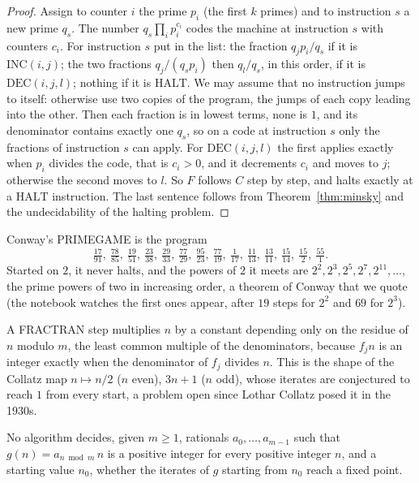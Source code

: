 \begin{proof}
Assign to counter $i$ the prime $p_i$ (the first $k$ primes) and to instruction $s$ a new prime $q_s$. The number $q_s\prod_ip_i^{c_i}$ codes the machine at instruction $s$ with counters $c_i$. For instruction $s$ put in the list: the fraction $q_jp_i/q_s$ if it is $\mathrm{INC}(i,j)$; the two fractions $q_j/(q_sp_i)$ then $q_l/q_s$, in this order, if it is $\mathrm{DEC}(i,j,l)$; nothing if it is $\mathrm{HALT}$. We may assume that no instruction jumps to itself: otherwise use two copies of the program, the jumps of each copy leading into the other. Then each fraction is in lowest terms, none is $1$, and its denominator contains exactly one $q_s$, so on a code at instruction $s$ only the fractions of instruction $s$ can apply. For $\mathrm{DEC}(i,j,l)$ the first applies exactly when $p_i$ divides the code, that is $c_i>0$, and it decrements $c_i$ and moves to $j$; otherwise the second moves to $l$. So $F$ follows $C$ step by step, and halts exactly at a $\mathrm{HALT}$ instruction. The last sentence follows from Theorem~\ref{thm:minsky} and the undecidability of the halting problem.
\end{proof}

Conway's PRIMEGAME is the program
\[
\tfrac{17}{91},\ \tfrac{78}{85},\ \tfrac{19}{51},\ \tfrac{23}{38},\ \tfrac{29}{33},\ \tfrac{77}{29},\ \tfrac{95}{23},\ \tfrac{77}{19},\ \tfrac1{17},\ \tfrac{11}{13},\ \tfrac{13}{11},\ \tfrac{15}{14},\ \tfrac{15}2,\ \tfrac{55}1.
\]
Started on $2$, it never halts, and the powers of $2$ it meets are $2^2,2^3,2^5,2^7,2^{11},\dots$, the prime powers of two in increasing order, a theorem of Conway that we quote (the notebook watches the first ones appear, after $19$ steps for $2^2$ and $69$ for $2^3$).

A FRACTRAN step multiplies $n$ by a constant depending only on the residue of $n$ modulo $m$, the least common multiple of the denominators, because $f_jn$ is an integer exactly when the denominator of $f_j$ divides $n$. This is the shape of the Collatz map $n\mapsto n/2$ ($n$ even), $3n+1$ ($n$ odd), whose iterates are conjectured to reach $1$ from every start, a problem open since Lothar Collatz posed it in the 1930s.

\begin{corollary}[Conway, 1972]\label{cor:collatz}
No algorithm decides, given $m\ge1$, rationals $a_0,\dots,a_{m-1}$ such that $g(n)=a_{n\bmod m}\,n$ is a positive integer for every positive integer $n$, and a starting value $n_0$, whether the iterates of $g$ starting from $n_0$ reach a fixed point.
\end{corollary}

